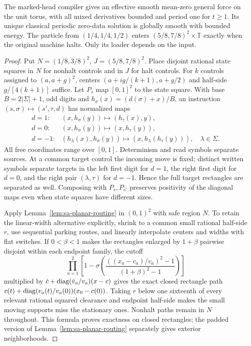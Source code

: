 \begin{theorem}
\label{thm:sa-marked-head-plane}
The marked-head compiler gives an effective smooth mean-zero general
force on the unit torus, with all mixed derivatives bounded and period
one for $t\ge1$.  Its unique classical periodic zero-data solution is
globally smooth with bounded energy.  The particle from
$(1/4,1/4,1/2)$ enters $(5/8,7/8)^2\times\mathbb T$ exactly when the
original machine halts.  Only its loader depends on the input.
\end{theorem}
\begin{proof}
Put $N=(1/8,3/8)^2$, $J=(5/8,7/8)^2$.  Place disjoint rational state
squares in $N$ for nonhalt controls and in $J$ for halt controls.
For $k$ controls assigned to $(a,a+g)^2$, centers
$(a+ig/(k+1),a+g/2)$ and half-side $g/[4(k+1)]$ suffice.
Let $P_s$ map $[0,1]^2$ to the state square.  With base
$B=2|\Sigma|+1$, odd digits and $h_\sigma(x)=(d(\sigma)+x)/B$, an
instruction $(s,\sigma)\mapsto(s',\tau,d)$ has normalized maps
\[
\begin{array}{ll}
 d=1:&(x,h_\sigma(y))\mapsto(h_\tau(x),y),\\
 d=0:&(x,h_\sigma(y))\mapsto(x,h_\tau(y)),\\
 d=-1:&(h_\lambda(x),h_\sigma(y))\mapsto
          (x,h_\lambda(h_\tau(y))),\quad\lambda\in\Sigma.
\end{array}
\]
All free coordinates range over $[0,1]$.  Determinism and read symbols
separate sources.  At a common target control the incoming move is
fixed; distinct written symbols separate targets in the left first
digit for $d=1$, the right first digit for $d=0$, and the right pair
$(\lambda,\tau)$ for $d=-1$.  Hence the full target rectangles are
separated as well.  Composing with $P_s,P_{s'}$ preserves positivity
of the diagonal maps even when state squares have different sizes.

Apply Lemma~\ref{lem:sa-planar-routing} in $(0,1)^2$ with safe region
$N$.  To retain the linear-width alternative explicitly, shrink to a
common small rational half-side $r$, use sequential parking routes,
and linearly interpolate centers and widths with flat switches.  If
$0<\beta<1$ makes the rectangles enlarged by $1+\beta$ pairwise
disjoint within each endpoint family, the cutoff
\[
 \prod_{a=1}^2\left[1-\sigma\!\left(
 \frac{((x_a-c_a)/v_a)^2-1}{(1+\beta)^2-1}\right)\right]
\]
multiplied by $\dot c+\operatorname{diag}(\dot v_a/v_a)(x-c)$ gives the exact closed
rectangle path $c(t)+\operatorname{diag}(v_a(t)/v_a(0))(x_0-c(0))$.
Taking $r$ below one sixteenth of every relevant rational squared
clearance and endpoint half-side makes the small moving supports
miss the stationary ones.  Nonhalt paths remain in $N$ throughout.
This formula proves exactness on closed rectangles; the padded version
of Lemma~\ref{lem:sa-planar-routing} separately gives exterior neighborhoods.


\end{proof}
